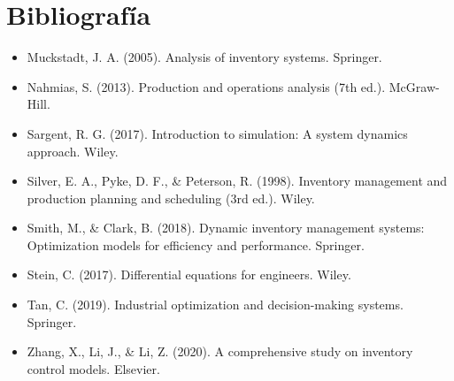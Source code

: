 \documentclass[12pt]{article}
\begin{document}
\section*{Bibliografía}
\begin{itemize}
    \item Muckstadt, J. A. (2005). Analysis of inventory systems. Springer.
    \item Nahmias, S. (2013). Production and operations analysis (7th ed.). McGraw-Hill.
    \item Sargent, R. G. (2017). Introduction to simulation: A system dynamics approach. Wiley.
    \item Silver, E. A., Pyke, D. F., \& Peterson, R. (1998). Inventory management and production planning and scheduling (3rd ed.). Wiley.
    \item Smith, M., \& Clark, B. (2018). Dynamic inventory management systems: Optimization models for efficiency and performance. Springer.
    \item Stein, C. (2017). Differential equations for engineers. Wiley.
    \item Tan, C. (2019). Industrial optimization and decision-making systems. Springer.
    \item Zhang, X., Li, J., \& Li, Z. (2020). A comprehensive study on inventory control models. Elsevier.
\end{itemize}
\end{document}
